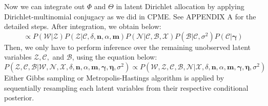 \documentclass[a4paper]{article}
\begin{document}
Now we can integrate out $\Phi$ and $\Theta$ in latent Dirichlet allocation by applying Dirichlet-multinomial conjugacy as we did in CPME. See APPENDIX A for the detailed steps. After integration, we obtain below:
\begin{equation}
\propto P(\mathcal{W}|\mathcal{Z})P( \mathcal{Z}|\mathcal{C}, \delta, \boldsymbol{n}, \alpha, \boldsymbol{m})P(\mathcal{N}|\mathcal{C}, \mathcal{B}, \mathcal{X})P(\mathcal{B}|\mathcal{C}, \sigma^2)P(\mathcal{C}|\boldsymbol{\gamma})
\end{equation}
Then, we only have to perform inference over the remaining unobserved latent variables $\mathcal{Z}, \mathcal{C},$ and $\mathcal{B}$, using the equation below:
\begin{equation}
P( \mathcal{Z}, \mathcal{C}, \mathcal{B}|\mathcal{W}, \mathcal{N}, \mathcal{X}, \delta, \boldsymbol{n}, \alpha, \boldsymbol{m}, \boldsymbol{\gamma}, \boldsymbol{\eta}, \sigma^2) \propto P(\mathcal{W},  \mathcal{Z}, \mathcal{C}, \mathcal{B}, \mathcal{N} | \mathcal{X}, \delta, \boldsymbol{n}, \alpha, \boldsymbol{m}, \boldsymbol{\gamma}, \boldsymbol{\eta}, \sigma^2)
\end{equation}
 Either Gibbs sampling or Metropolis-Hastings algorithm is applied by sequentially resampling each latent variables from their respective conditional posterior.
\end{document}
